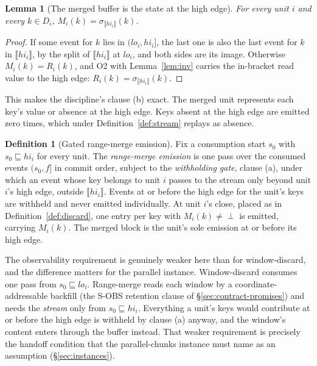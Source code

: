 \documentclass[sigconf,nonacm,10pt]{acmart}
\theoremstyle{plain}
\newtheorem{lemma}{Lemma}[section]
\theoremstyle{definition}
\newtheorem{definition}{Definition}[section]
\newcommand{\den}[1]{\llbracket #1 \rrbracket}   %
\newcommand{\pre}{\sqsubseteq}                   %
\newcommand{\window}[2]{(#1,#2]}                 %
\begin{document}
\begin{lemma}[The merged buffer is the state at the high edge]
\label{lem:merged}
For every unit $i$ and every $k \in D_i$,
$M_i(k) = \sigma_{\den{hi_i}}(k)$.
\end{lemma}

\begin{proof}
If some event for $k$ lies in $\window{lo_i}{hi_i}$, the last one
is also the last event for $k$ in $\den{hi_i}$, by the split of
$\den{hi_i}$ at $lo_i$, and both sides are its image. Otherwise
$M_i(k) = R_i(k)$, and O2 with Lemma~\ref{lem:inv} carries the
in-bracket read value to the high edge:
$R_i(k) = \sigma_{\den{hi_i}}(k)$.
\end{proof}

This makes the discipline's clause (b) exact. The merged unit
represents each key's value or absence at the high edge. Keys absent at
the high edge are emitted zero times, which under
Definition~\ref{def:stream} replays as absence.

\begin{definition}[Gated range-merge emission]\label{def:rm}
Fix a consumption start $s_0$ with $s_0 \pre hi_i$ for every unit.
The \emph{range-merge emission} is one pass over the consumed
events $\window{s_0}{f}$ in commit order, subject to the
\emph{withholding gate}, clause (a), under which an event whose key belongs to
unit $i$ passes to the stream only beyond unit $i$'s high
edge, outside $\den{hi_i}$. Events at or before the high edge for the 
unit's keys are withheld and never emitted individually. At unit $i$'s close,
placed as in Definition~\ref{def:discard}, one entry per key with
$M_i(k) \neq \perp$ is emitted, carrying $M_i(k)$. The merged
block is the unit's sole emission at or before its high edge.
\end{definition}

The observability requirement is genuinely weaker here than for
window-discard, and the difference matters for the parallel instance. Window-discard consumes one pass from
$s_0 \pre lo_i$. Range-merge reads each window by a coordinate-
addressable backfill (the S-OBS retention clause of
\S\ref{sec:contract-promises}) and needs the \emph{stream} only from $s_0 \pre hi_i$. Everything a unit's keys would contribute at or before the high edge is withheld by clause (a) anyway, and the window's content enters through the buffer instead.
That weaker requirement is precisely the handoff condition that the
parallel-chunks instance must name as an assumption
(\S\ref{sec:instances}).
\end{document}
